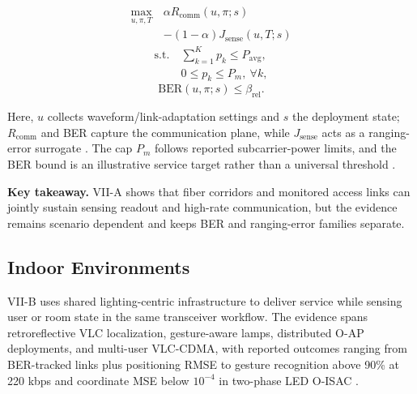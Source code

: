 \begin{equation}
    \begin{split}
        \max_{u,\pi,T}\  & \alpha R_{\mathrm{comm}}(u,\pi;s)      \\
                         & - (1-\alpha) J_{\mathrm{sense}}(u,T;s)
    \end{split}
\end{equation}
\begin{equation}
    \begin{split}
        \text{s.t.}\  & \sum_{k=1}^{K} p_k \le P_{\mathrm{avg}}, \\
                      & 0 \le p_k \le P_m,\ \forall k,
    \end{split}
\end{equation}
\begin{equation}
    \mathrm{BER}(u,\pi;s) \le \beta_{\mathrm{rel}}.
\end{equation}

Here, $u$ collects waveform/link-adaptation settings and $s$ the deployment state; $R_{\mathrm{comm}}$ and BER capture the communication plane, while $J_{\mathrm{sense}}$ acts as a ranging-error surrogate \cite{O_ISAC_034,O_ISAC_048}. The cap $P_m$ follows reported subcarrier-power limits, and the BER bound is an illustrative service target rather than a universal threshold \cite{O_ISAC_034,O_ISAC_048}.

\textbf{Key takeaway.} VII-A shows that fiber corridors and monitored access links can jointly sustain sensing readout and high-rate communication, but the evidence remains scenario dependent and keeps BER and ranging-error families separate.

\subsection{Indoor Environments}

VII-B uses shared lighting-centric infrastructure to deliver service while sensing user or room state in the same transceiver workflow. The evidence spans retroreflective VLC localization, gesture-aware lamps, distributed O-AP deployments, and multi-user VLC-CDMA, with reported outcomes ranging from BER-tracked links plus positioning RMSE to gesture recognition above 90\% at 220 kbps and coordinate MSE below $10^{-4}$ in two-phase LED O-ISAC \cite{O_ISAC_011,O_ISAC_030,O_ISAC_108,O_ISAC_388}.

